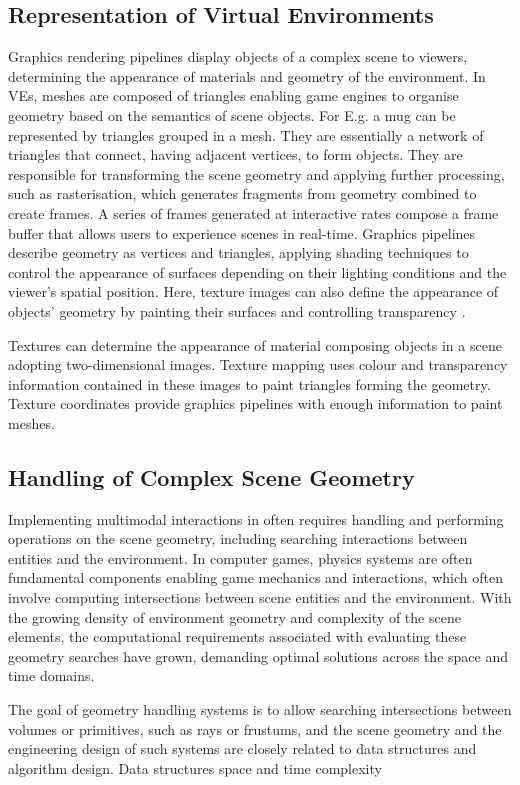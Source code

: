 \subsection{Representation of Virtual Environments}
Graphics rendering pipelines display objects of a complex scene to viewers, determining the appearance of materials and geometry of the environment. In VEs, meshes are composed of triangles enabling game engines to organise geometry based on the semantics of scene objects. For E.g. a mug can be represented by triangles grouped in a mesh. They are essentially a network of triangles that connect, having adjacent vertices, to form objects. They are responsible for transforming the scene geometry and applying further processing, such as rasterisation, which generates fragments from geometry combined to create frames. A series of frames generated at interactive rates compose a frame buffer that allows users to experience scenes in real-time. Graphics pipelines describe geometry as vertices and triangles, applying shading techniques to control the appearance of surfaces depending on their lighting conditions and the viewer’s spatial position. Here, texture images can also define the appearance of objects' geometry by painting their surfaces and controlling transparency \citep{mcallister2002efficient, marschner2015fundamentals}.\par
Textures can determine the appearance of material composing objects in a scene adopting two-dimensional images. Texture mapping uses colour and transparency information contained in these images to paint triangles forming the geometry. Texture coordinates provide graphics pipelines with enough information to paint meshes.

\subsection{Handling of Complex Scene Geometry}\label{sec:bg-geometry-handling}
Implementing multimodal interactions in  often requires handling and performing operations on the scene geometry, including searching interactions between entities and the environment. In computer games, physics systems are often fundamental components enabling game mechanics and interactions, which often involve computing intersections between scene entities and the environment. With the growing density of environment geometry and complexity of the scene elements, the computational requirements associated with evaluating these geometry searches have grown, demanding optimal solutions across the space and time domains.\par
The goal of geometry handling systems is to allow searching intersections between volumes or primitives, such as rays or frustums, and the scene geometry and the engineering design of such systems are closely related to data structures and algorithm design. Data structures space and time complexity


